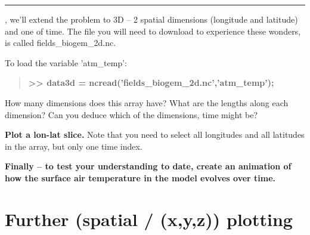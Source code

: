 \documentclass{tufte-book} %
\newenvironment{docspecbold}{\begin{quotation}\ttfamily\bfseries\parskip0pt\parindent0pt\ignorespaces}{\end{quotation}}
\begin{document}
\vspace{-1mm}
\noindent\rule{4cm}{0.5pt}
\vspace{-2mm}

, we'll extend the problem to 3D -- 2 spatial dimensions (longitude and latitude) and one of time. The file you will need to download to experience these wonders, is called \textsf{fields\_biogem\_2d.nc}.

To load the variable \textsf{'atm\_temp'}:

\begin{docspecbold}
>> data3d = ncread('fields\_biogem\_2d.nc','atm\_temp');
\end{docspecbold}

How many dimensions does this array have? What are the lengths along each dimension? Can you deduce which of the dimensions, time might be?

\textbf{Plot a lon-lat slice.} Note that you need to select all longitudes and all latitudes in the array, but only one time index.

\textbf{Finally -- to test your understanding to date, create an animation of how the surface air temperature in the model evolves over time.}


\newpage


\section{Further (spatial / (x,y,z)) plotting}
\end{document}
